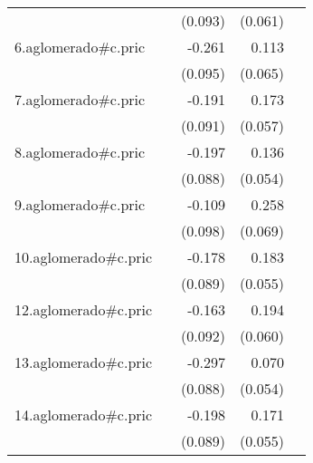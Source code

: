 {\begin{longtable}{l*{4}{D{.}{.}{-1}}}
            &                     &     (0.093)         &     (0.061)         &                     \\
\addlinespace
6.aglomerado#c.pric&                     &      -0.261\sym{**} &       0.113         &                     \\
            &                     &     (0.095)         &     (0.065)         &                     \\
\addlinespace
7.aglomerado#c.pric&                     &      -0.191\sym{*}  &       0.173\sym{**} &                     \\
            &                     &     (0.091)         &     (0.057)         &                     \\
\addlinespace
8.aglomerado#c.pric&                     &      -0.197\sym{*}  &       0.136\sym{*}  &                     \\
            &                     &     (0.088)         &     (0.054)         &                     \\
\addlinespace
9.aglomerado#c.pric&                     &      -0.109         &       0.258\sym{***}&                     \\
            &                     &     (0.098)         &     (0.069)         &                     \\
\addlinespace
10.aglomerado#c.pric&                     &      -0.178\sym{*}  &       0.183\sym{***}&                     \\
            &                     &     (0.089)         &     (0.055)         &                     \\
\addlinespace
12.aglomerado#c.pric&                     &      -0.163         &       0.194\sym{**} &                     \\
            &                     &     (0.092)         &     (0.060)         &                     \\
\addlinespace
13.aglomerado#c.pric&                     &      -0.297\sym{***}&       0.070         &                     \\
            &                     &     (0.088)         &     (0.054)         &                     \\
\addlinespace
14.aglomerado#c.pric&                     &      -0.198\sym{*}  &       0.171\sym{**} &                     \\
            &                     &     (0.089)         &     (0.055)         &                     \\

\end{longtable}}
